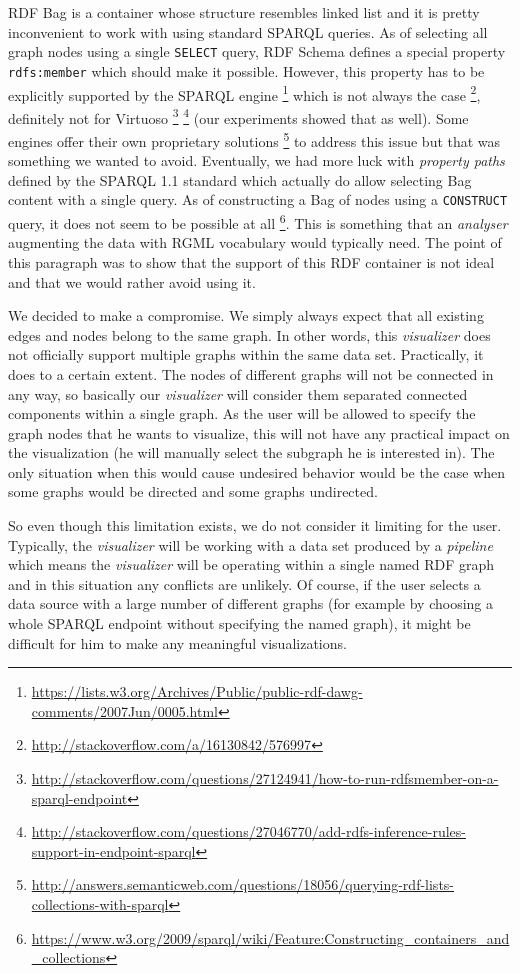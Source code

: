 RDF Bag \cite{rdf_vocab} is a container whose structure resembles linked list and it is pretty inconvenient to work with using standard SPARQL queries. As of selecting all graph nodes using a single \texttt{SELECT} query, RDF Schema \cite{rdfs} defines a special property \texttt{rdfs:member} which should make it possible. However, this property has to be explicitly supported by the SPARQL engine 
\footnote{\url{https://lists.w3.org/Archives/Public/public-rdf-dawg-comments/2007Jun/0005.html}} which is not always the case 
\footnote{\url{http://stackoverflow.com/a/16130842/576997}}, definitely not for Virtuoso
\footnote{\url{http://stackoverflow.com/questions/27124941/how-to-run-rdfsmember-on-a-sparql-endpoint}}
\footnote{\url{http://stackoverflow.com/questions/27046770/add-rdfs-inference-rules-support-in-endpoint-sparql}} (our experiments showed that as well). Some engines offer their own proprietary solutions 
\footnote{\url{http://answers.semanticweb.com/questions/18056/querying-rdf-lists-collections-with-sparql}} to address this issue but that was something we wanted to avoid. Eventually, we had more luck with \emph{property paths} defined by the SPARQL 1.1 standard \cite{sparql-11} which actually do allow selecting Bag content with a single query.  As of constructing a Bag of nodes using  a \texttt{CONSTRUCT} query, it does not seem to be possible at all 
\footnote{\url{https://www.w3.org/2009/sparql/wiki/Feature:Constructing\_containers\_and\_collections}}. This is something that an \emph{analyser} augmenting the data with RGML vocabulary would typically need. The point of this paragraph was to show that the support of this RDF container is not ideal and that we would rather avoid using it.

We decided to make a compromise. We simply always expect that all existing edges and nodes belong to the same graph. In other words, this \emph{visualizer} does not officially support multiple graphs within the same data set. Practically, it does to a certain extent. The nodes of different graphs will not be connected in any way, so basically our \emph{visualizer} will consider them separated connected components within a single graph. As the user will be allowed to specify the graph nodes that he wants to visualize, this will not have any practical impact on the visualization (he will manually select the subgraph he is interested in). The only situation when this would cause undesired behavior would be the case when some graphs would be directed and some graphs undirected. 

So even though this limitation exists, we do not consider it limiting for the user. Typically, the \emph{visualizer} will be working with a data set produced by a \emph{pipeline} which means the \emph{visualizer} will be operating within a single named RDF graph and in this situation any conflicts are unlikely. Of course, if the user selects a data source with a large number of different graphs (for example by choosing a whole SPARQL endpoint without specifying the named graph), it might be difficult for him to make any meaningful visualizations.

